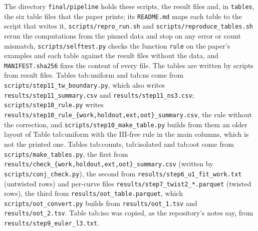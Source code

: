 \begin{sloppypar}
\begin{remark}
The directory \texttt{final/\allowbreak pipeline} holds these scripts, the result files and, in \texttt{tables}, the six table files that the paper prints;
its \texttt{README.md} maps each table to the script that writes it, \texttt{scripts/repro\_run.sh} and \texttt{scripts/reproduce\_tables.sh} rerun the
computations from the pinned data and stop on any error or count mismatch, \texttt{scripts/selftest.py} checks the function \texttt{rule} on the paper's
examples and each table against the result files without the data, and \texttt{MANIFEST.sha256} fixes the content of every file. The tables are written by scripts from result files. Tables tab:uniform and tab:ns come from
\texttt{scripts/step11\_tw\_boundary.py}, which also writes \texttt{results/step11\_summary.csv} and \texttt{results/step11\_ns3.csv};
\texttt{scripts/step10\_rule.py} writes \texttt{results/step10\_rule\_\{work,holdout,ext,oot\}\_summary.csv}, the rule without the correction, and
\texttt{scripts/step10\_make\_table.py} builds from them an older layout of Table tab:uniform with the III-free rule in the main columns, which is not the printed one.
Tables tab:counts, tab:isolated and tab:oot come from \texttt{scripts/make\_tables.py}, the first from \texttt{results/check\_\{work,holdout,ext,oot\}\_summary.csv}
(written by \texttt{scripts/conj\_check.py}), the second from \texttt{results/step6\_u1\_fit\_work.txt} (untwisted rows) and per-curve files
\texttt{results/step7\_twist2\_*.parquet} (twisted rows), the third from \texttt{results/oot\_table.parquet}, which \texttt{scripts/oot\_convert.py} builds from
\texttt{results/oot\_1.tsv} and \texttt{results/oot\_2.tsv}. Table tab:iso was copied, as the repository's notes say, from \texttt{results/step9\_euler\_l3.txt}.


\end{remark}
\end{sloppypar}
